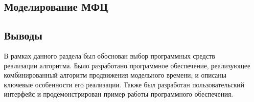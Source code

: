 \subsection{Моделирование МФЦ}

\subsection{Выводы}
В рамках данного раздела был обоснован выбор программных средств реализации алгоритма. Было разработано программное обеспечение, реализующее комбинированный алгоритм продвижения модельного времени, и описаны ключевые особенности его реализации. Также был разработан пользовательский интерфейс и продемонстрирован пример работы программного обеспечения.
